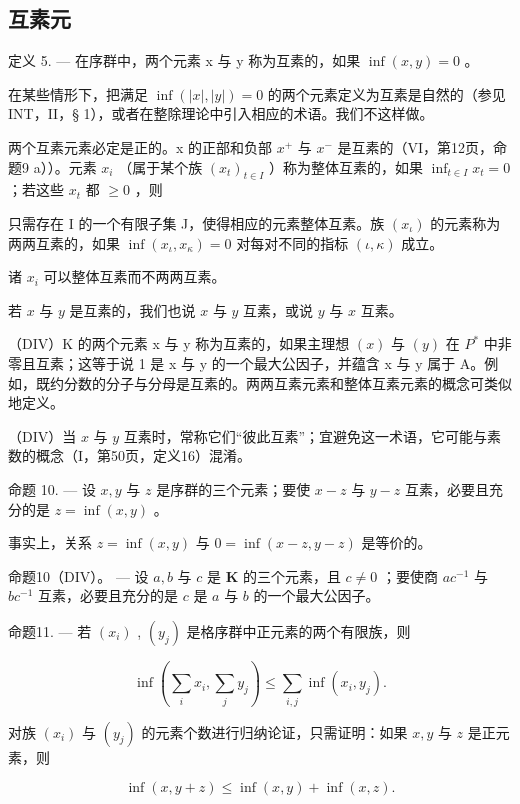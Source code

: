 \subsection{互素元}

定义 5. --- 在序群中，两个元素 x 与 y 称为互素的，如果 \(\inf(x, y) = 0\) 。

在某些情形下，把满足 \(\inf(|x|, |y|) = 0\) 的两个元素定义为互素是自然的（参见 INT，II，§ 1），或者在整除理论中引入相应的术语。我们不这样做。

两个互素元素必定是正的。x 的正部和负部 \(x^{+}\) 与 \(x^{-}\) 是互素的（VI，第12页，命题9 a））。元素 \(x_{i}\) （属于某个族 \((x_{t})_{t\in I}\) ）称为整体互素的，如果 \(\inf_{t\in I}x_t = 0\) ；若这些 \(x_{t}\) 都 \(\geqslant 0\) ，则

只需存在 I 的一个有限子集 J，使得相应的元素整体互素。族 \((x_{\iota})\) 的元素称为两两互素的，如果 \(\inf(x_{\iota}, x_{\kappa}) = 0\) 对每对不同的指标 \((\iota, \kappa)\) 成立。

诸 \(x_{i}\) 可以整体互素而不两两互素。

若 \(x\) 与 \(y\) 是互素的，我们也说 \(x\) 与 \(y\) 互素，或说 \(y\) 与 \(x\) 互素。

（DIV）K 的两个元素 x 与 y 称为互素的，如果主理想 \((x)\) 与 \((y)\) 在 \(P^{*}\) 中非零且互素；这等于说 1 是 x 与 y 的一个最大公因子，并蕴含 x 与 y 属于 A。例如，既约分数的分子与分母是互素的。两两互素元素和整体互素元素的概念可类似地定义。

（DIV）当 \(x\) 与 \(y\) 互素时，常称它们“彼此互素”；宜避免这一术语，它可能与素数的概念（I，第50页，定义16）混淆。

命题 10. --- 设 \(x, y\) 与 \(z\) 是序群的三个元素；要使 \(x - z\) 与 \(y - z\) 互素，必要且充分的是 \(z = \inf(x, y)\) 。

事实上，关系 \(z = \inf (x, y)\) 与 \(0 = \inf (x - z, y - z)\) 是等价的。

命题10（DIV）。 --- 设 \(a, b\) 与 \(c\) 是 \(\mathbf{K}\) 的三个元素，且 \(c \neq 0\) ；要使商 \(ac^{-1}\) 与 \(bc^{-1}\) 互素，必要且充分的是 \(c\) 是 \(a\) 与 \(b\) 的一个最大公因子。

命题11. --- 若 \((x_{i})\) , \((y_{j})\) 是格序群中正元素的两个有限族，则

\[
\inf \left(\sum_ {i} x _ {i}, \sum_ {j} y _ {j}\right) \leqslant \sum_ {i, j} \inf (x _ {i}, y _ {j}).
\]

对族 \((x_{i})\) 与 \((y_{j})\) 的元素个数进行归纳论证，只需证明：如果 \(x, y\) 与 \(z\) 是正元素，则

\[
\inf (x, y + z) \leqslant \inf (x, y) + \inf (x, z).
\]

